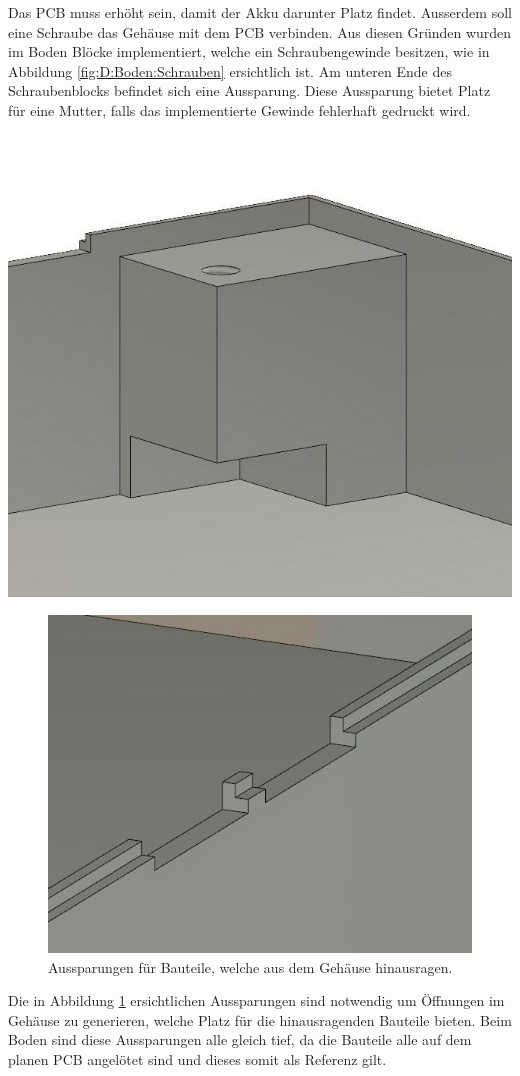 {\begin{minipage}[b][8cm][t]{0.39\textwidth}
Das PCB muss erhöht sein, damit der Akku darunter Platz findet. Ausserdem soll eine Schraube das Gehäuse mit dem PCB verbinden. Aus diesen Gründen wurden im Boden Blöcke implementiert, welche ein Schraubengewinde besitzen, wie in Abbildung \ref{fig:D:Boden:Schrauben} ersichtlich ist. Am unteren Ende des Schraubenblocks befindet sich eine Aussparung. Diese Aussparung bietet Platz für eine Mutter, falls das implementierte Gewinde fehlerhaft gedruckt wird.
\end{minipage}}
{\begin{minipage}[b][8cm][t]{0.6\textwidth}
\centering
\includegraphics[width=0.8\linewidth]{graphics/Gehaeuse/Design_Boden_Schrauben.jpg}
\label{fig:D:Boden:Schrauben}
\end{minipage}}

\newpage
\begin{figure}[h]
\centering
\includegraphics[width=0.5\linewidth]{graphics/Gehaeuse/Design_Boden_Aussparungen.jpg}
\caption{Aussparungen für Bauteile, welche aus dem Gehäuse hinausragen.}
\label{fig:D:Boden:Aussparungen}
\end{figure}
Die in Abbildung \ref{fig:D:Boden:Aussparungen} ersichtlichen Aussparungen sind notwendig um Öffnungen im Gehäuse zu generieren, welche Platz für die hinausragenden Bauteile bieten. Beim Boden sind diese Aussparungen alle gleich tief, da die Bauteile alle auf dem planen PCB angelötet sind und dieses somit als Referenz gilt.

